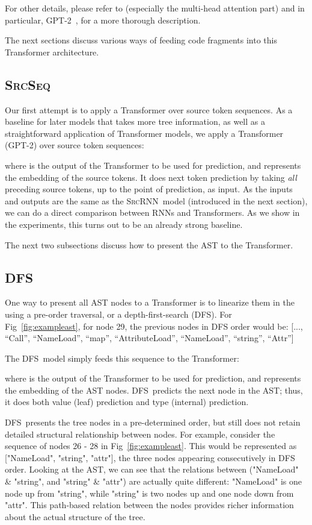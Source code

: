 \documentclass[nonacm, sigconf]{acmart}
\newcommand{\abbr}[1]{\textsc{#1}~}
\newcommand{\SrcSeq}{\abbr{SrcSeq}} \newcommand{\SrcRNN}{\abbr{SrcRNN}} \newcommand{\LeafSeq}{\abbr{LeafSeq}} \newcommand{\RootPath}{\abbr{RootPath}} \newcommand{\LeafTokens}{\abbr{LeafTokens}} \newcommand{\DFS}{\abbr{DFS}} \newcommand{\TreeRel}{\abbr{DFS{ud}}} \newcommand{\TreeReli}{\abbr{DFS{ud+}}}
\newcommand{\figref}[1]{Fig~\ref{#1}}
\begin{document}
For other details, please refer to \citet{vaswani2017attention} (especially the multi-head attention part) and in particular, GPT-2~\citep{radford2019language-gpt2}, for a more thorough description.

The next sections discuss various ways of feeding code fragments into this Transformer architecture.






\subsection{\SrcSeq}
Our first attempt is to apply a Transformer over source token sequences.
As a baseline for later models that takes more tree information, as well as a straightforward application of Transformer models, we apply a Transformer (GPT-2) over source token sequences:


where  is the output of the Transformer to be used for prediction, and  represents the embedding of the source tokens.
It does next token prediction by taking \textit{all} preceding source tokens, up to the point of prediction, as input. As the inputs and outputs are the same as the \SrcRNN model (introduced in the next section), we can do a direct comparison between RNNs and Transformers.
As we show in the experiments, this turns out to be an already strong baseline.

The next two subsections discuss how to present the AST to the Transformer.

\subsection{\DFS}
One way to present all AST nodes to a Transformer is to linearize them in the using a pre-order traversal, or a depth-first-search (DFS). For Fig~\ref{fig:exampleast}, for node 29, the previous nodes in DFS order would be:
[..., ``Call'', ``NameLoad'', ``map'', ``AttributeLoad'', ``NameLoad'', ``string'', ``Attr'']

The \DFS model simply feeds this sequence to the Transformer:

where  is the output of the Transformer to be used for prediction, and  represents the embedding of the AST nodes.
\DFS predicts the next node in the AST; thus, it does both value (leaf) prediction and type (internal) prediction. 

\DFS presents the tree nodes in a pre-determined order, but still does not retain detailed structural relationship between nodes.
For example, consider the sequence of nodes 26 - 28 in \figref{fig:exampleast}. This would be represented as ["NameLoad", "string", "attr"], the three nodes appearing consecutively in DFS order. Looking at the AST, we can see that the relations between ("NameLoad" \& "string", and "string" \& "attr") are actually quite different: "NameLoad" is one node up from "string", while "string" is two nodes up and one node down from "attr". This path-based relation between the nodes provides richer information about the actual structure of the tree.
\end{document}
